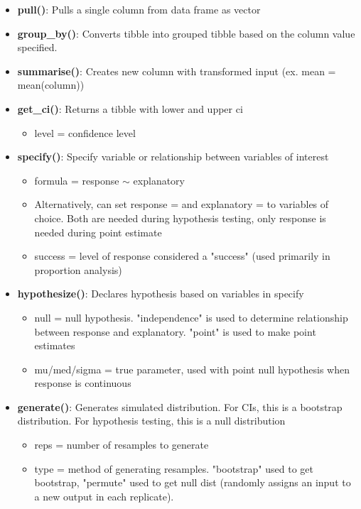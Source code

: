 \documentclass[8pt,landscape,a4paper, fleqn, dvipsnames]{extarticle}
\begin{document}
\begin{multicols*}{4}
\begin{itemize}
\begin{itemize}
\begin{itemize}
        \end{itemize}
        \item \textbf{pull()}: Pulls a single column from data frame as vector
        \item \textbf{group\_by()}: Converts tibble into grouped tibble based on the column value specified.
        \item \textbf{summarise()}: Creates new column with transformed input (ex. mean = mean(column))
        \item \textbf{get\_ci()}: Returns a tibble with lower and upper ci
        \begin{itemize}
            \item level = confidence level
        \end{itemize}
        \item \textbf{specify()}: Specify variable or relationship between variables of interest
        \begin{itemize}
            \item formula = response $\sim$ explanatory 
            \item Alternatively, can set response = and explanatory = to variables of choice. Both are needed during hypothesis testing, only response is needed during point estimate
            \item success = level of response considered a "success" (used primarily in proportion analysis)
        \end{itemize}
        \item \textbf{hypothesize()}: Declares hypothesis based on variables in specify
        \begin{itemize}
            \item null = null hypothesis. "independence" is used to determine relationship between response and explanatory. "point" is used to make point estimates
            \item mu/med/sigma = true parameter, used with point null hypothesis when response is continuous
        \end{itemize}
        \item \textbf{generate()}: Generates simulated distribution. For CIs, this is a bootstrap distribution. For hypothesis testing, this is a null distribution
        \begin{itemize}
            \item reps = number of resamples to generate
            \item type = method of generating resamples. "bootstrap" used to get bootstrap, "permute" used to get null dist (randomly assigns an input to a new output in each replicate).

\end{itemize}
\end{itemize}
\end{itemize}
\end{multicols*}
\end{document}
